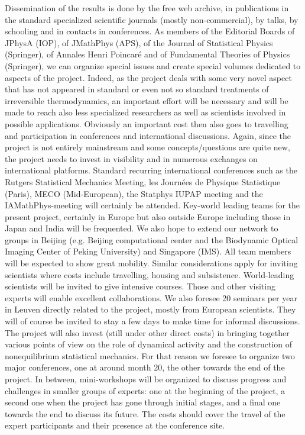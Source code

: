 Dissemination of the results is done by the free web archive, in publications in the standard specialized scientific journals (mostly non-commercial), by talks, by schooling and in contacts in conferences. As members of the Editorial Boards of JPhysA (IOP), of JMathPhys (APS), of the Journal of Statistical Physics (Springer), of Annales Henri Poincar\'e and of Fundamental Theories of Physics (Springer), we can organize special issues and create special volumes dedicated to aspects of the project. Indeed, as the project deals with some very novel aspect that has not appeared in standard or even not so standard treatments of irreversible thermodynamics, an important effort will be necessary and will be made to reach also less specialized researchers as well as scientists involved in possible applications.
Obviously an important cost then also goes to travelling and participation in conferences and international discussions. Again, since the project is not entirely mainstream and some concepts/questions are quite new, the project needs to invest in visibility and in numerous exchanges on international platforms. Standard recurring international conferences such as the Rutgers Statistical Mechanics Meeting, les Journées de Physique Statistique (Paris), MECO (Mid-European), the Statphys IUPAP meeting and the IAMathPhys-meeting will certainly be attended.  Key-world leading teams for the present project, certainly in Europe but also outside Europe including those in Japan and India will be frequented. We also hope to extend our network to groups in Beijing (e.g. Beijing computational center and the Biodynamic Optical Imaging Center of Peking University) and Singapore (IMS).  All team members will be expected to show great mobility.  Similar considerations apply for inviting scientists where costs include travelling, housing and subsistence. World-leading scientists will be invited to give intensive courses.  Those and other visiting experts will enable excellent collaborations.  We also foresee 20 seminars per year in Leuven directly related to the project, mostly from European scientists. They will of course be invited to stay a few days to make time for informal discussions. The project will also invest (still under other direct costs) in bringing together various points of view on the role of dynamical activity and the construction of nonequilibrium statistical mechanics. For that reason we foresee to organize two major conferences, one at around month 20, the other towards the end of the project.  In between, mini-workshops will be organized to discuss progress and challenges in smaller groups of experts: one at the beginning of the project, a second one when the project has gone through initial stages, and a final one towards the end to discuss its future. The costs should cover the travel of the expert participants and their presence at the conference site.


